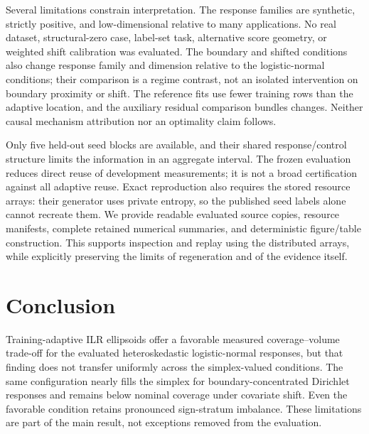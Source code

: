 \documentclass{article}
\begin{document}
Several limitations constrain interpretation. The response families are synthetic, strictly positive, and low-dimensional relative to many applications. No real dataset, structural-zero case, label-set task, alternative score geometry, or weighted shift calibration was evaluated. The boundary and shifted conditions also change response family and dimension relative to the logistic-normal conditions; their comparison is a regime contrast, not an isolated intervention on boundary proximity or shift. The reference fits use fewer training rows than the adaptive location, and the auxiliary residual comparison bundles changes. Neither causal mechanism attribution nor an optimality claim follows.

Only five held-out seed blocks are available, and their shared response/control structure limits the information in an aggregate interval. The frozen evaluation reduces direct reuse of development measurements; it is not a broad certification against all adaptive reuse. Exact reproduction also requires the stored resource arrays: their generator uses private entropy, so the published seed labels alone cannot recreate them. We provide readable evaluated source copies, resource manifests, complete retained numerical summaries, and deterministic figure/table construction. This supports inspection and replay using the distributed arrays, while explicitly preserving the limits of regeneration and of the evidence itself.

\section{Conclusion}
Training-adaptive ILR ellipsoids offer a favorable measured coverage--volume trade-off for the evaluated heteroskedastic logistic-normal responses, but that finding does not transfer uniformly across the simplex-valued conditions. The same configuration nearly fills the simplex for boundary-concentrated Dirichlet responses and remains below nominal coverage under covariate shift. Even the favorable condition retains pronounced sign-stratum imbalance. These limitations are part of the main result, not exceptions removed from the evaluation.
\end{document}
